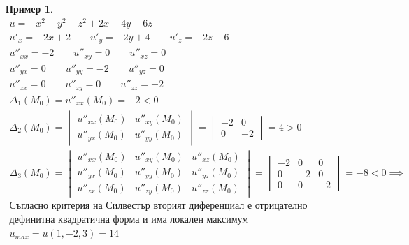 \documentclass[a4paper,fleqn,12pt]{article}
\theoremstyle{definition}
\newtheorem{example}{Пример}[subsection]
\begin{document}
\begin{example}
\begin{gather*}
u = -x^2 - y^2 - z^2 + 2x + 4y - 6z \\
u'_x = -2x + 2 \qquad u'_y = -2y + 4 \qquad u'_z = -2z - 6 \\
u''_{xx} = -2 \qquad u''_{xy} = 0 \qquad u''_{xz} = 0 \\
u''_{yx} = 0 \qquad u''_{yy} = -2 \qquad u''_{yz} = 0 \\
u''_{zx} = 0 \qquad u''_{zy} = 0 \qquad u''_{zz} = -2 \\
\Delta_1 (M_0) = u''_{xx}(M_0) = -2 <0 \\
\Delta_2 (M_0) = 
\begin{vmatrix}
u''_{xx}(M_0) &  u''_{xy}(M_0) \\ 
u''_{yx}(M_0) &  u''_{yy}(M_0) 
\end{vmatrix} = 
\begin{vmatrix}
-2 & 0 \\ 
0 & -2
\end{vmatrix} = 4 >0 \\
\Delta_3 (M_0) = 
\begin{vmatrix}
u''_{xx}(M_0) &  u''_{xy}(M_0)  & u''_{xz}(M_0)\\ 
u''_{yx}(M_0) &  u''_{yy}(M_0)  & u''_{yz}(M_0) \\
u''_{zx}(M_0) &  u''_{zy}(M_0)  & u''_{zz}(M_0)
\end{vmatrix} = 
\begin{vmatrix}
-2 &  0  & 0\\ 
0 & -2  & 0 \\
0 & 0 & -2
\end{vmatrix} = -8 < 0 
\implies \\
\text{Съгласно критерия на Силвестър вторият диференциал е отрицателно} \\
\text{дефинитна квадратична форма и има локален максимум} \\
u_{max} = u(1,-2,3) = 14 
\end{gather*}


\end{example}
\end{document}
